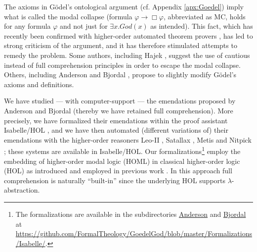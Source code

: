\documentclass{birkjour}
\theoremstyle{definition}
\theoremstyle{remark}
\numberwithin{equation}{section}
\begin{document}
\maketitle

\vspace*{-5em}

The axioms in G\"odel's ontological argument 
\cite{GoedelNotes,ScottNotes} (cf. Appendix \ref{apx:Goedel}) imply what is called the modal collapse
\cite{Sobel1987,SobelBook2004} (formula $\varphi \rightarrow \Box
\varphi$, abbreviated as MC, holds for any formula $\varphi$ and not
just for $\exists x. God(x)$ as intended). This fact, which has
recently been confirmed with higher-order automated theorem provers
\cite{C40,J30}, has led to strong criticism of the argument, and
it has therefore stimulated attempts to remedy the problem. Some
authors, including Hajek
\cite{Hajek_der_Mathematiker_2002,Hajek_Magari_and_others_1996}, suggest the use
of cautious instead of full comprehension principles in order to
escape the modal collapse. Others, including Anderson
\cite{anderson90:_some_emend_of_goedel_ontol_proof,AndersonGettings}
and Bjordal \cite{bjordal99}, propose to slightly modify
G\"odel's axioms and definitions.

We have studied --- with computer-support --- the emendations proposed
by Anderson and Bjordal (thereby we have retained full comprehension).
More precisely, we have formalized their emendations within the proof
assistant Isabelle/HOL \cite{Isabelle}, and we have then automated
(different variations of) their emendations with the higher-order
reasoners Leo-II \cite{C26}, Satallax \cite{brown2012satallax}, Metis
\cite{Hurd03first-orderproof} and Nitpick \cite{Nitpick}; these systems
are available in Isabelle/HOL.  Our formalizations\footnote{The
  formalizations are available in the subdirectories \url{Anderson}
  and \url{Bjordal} at
  \url{https://github.com/FormalTheology/GoedelGod/blob/master/Formalizations/Isabelle/}.}
employ the embedding of higher-order modal logic (HOML) in classical
higher-order logic (HOL) as introduced and employed in previous
work \cite{C40,J30,J23}. In this approach full comprehension is
naturally ``built-in'' since the underlying HOL supports
$\lambda$-abstraction.
\end{document}
